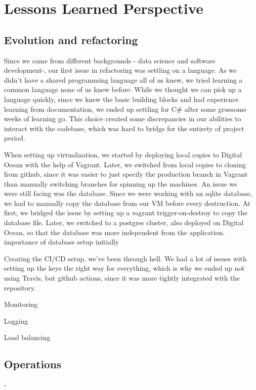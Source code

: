 \documentclass[report/main.tex]{subfiles}
\begin{document}
    \section{Lessons Learned Perspective}
    \label{Sec:lessons_learned_persective}
        \subsection{Evolution and refactoring}
            Since we came from different backgrounds - data science and software development-, our first issue in refactoring was settling on a language. As we didn't have a shared programming language all of us knew, we tried learning a common language none of us knew before. While we thought we can pick up a language quickly, since we knew the basic building blocks and had experience learning from documentation, we ended up settling for C\# after some gruesome weeks of learning go. This choice created some discrepancies in our abilities to interact with the codebase, which was hard to bridge for the entirety of project period.
    
            When setting up virtualization, we started by deploying local copies to Digital Ocean with the help of Vagrant. Later, we switched from local copies to cloning from github, since it was easier to just specify the production branch in Vagrant than manually switching branches for spinning up the machines. An issue we were still facing was the database. Since we were working with an sqlite database, we had to manually copy the database from our VM before every destruction. At first, we bridged the issue by setting up a vagrant trigger-on-destroy to copy the database file. Later, we switched to a postgres cluster, also deployed on Digital Ocean, so that the database was more independent from the application.
            importance of database setup initially
    
            Creating the CI/CD setup, we've been through hell. We had a lot of issues with setting up the keys the right way for everything, which is why we ended up not using Travis, but github actions, since it was more tightly integrated with the repository.
    
            Monitoring
    
            Logging
    
            Load balancing
            
        \subsection{Operations}
            - 
        
\end{document}
